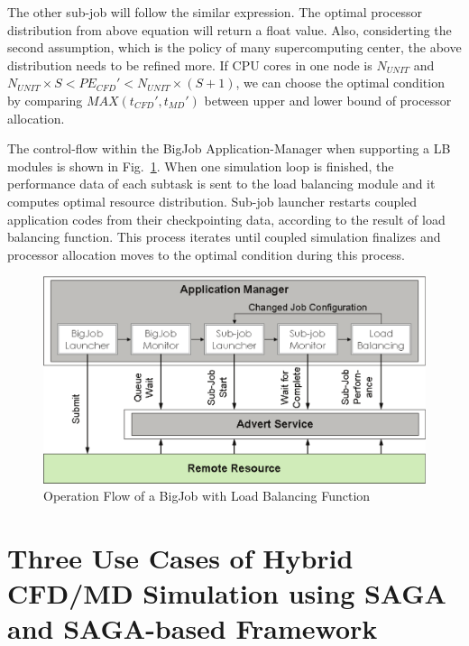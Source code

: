 \documentclass[conference,final]{IEEEtran}
\begin{document}
The other sub-job will follow the similar expression.
The optimal processor distribution from above equation will return a float value. Also, considerting the second assumption, which is the policy of many supercomputing center, the above distribution needs to be refined more. If CPU cores in one node is $N_{UNIT}$ and $N_{UNIT} \times S < PE_{CFD}' < N_{UNIT} \times (S+1)$, we can choose the optimal condition by comparing $MAX(t_{CFD}',t_{MD}')$ between upper and lower bound of processor allocation.


The control-flow within the BigJob Application-Manager when supporting a LB modules is shown
in Fig.~\ref{Fig:BigJob_LB}. When one simulation loop is finished, the performance data of each subtask is sent to the load balancing module and it computes optimal resource distribution. Sub-job launcher restarts coupled application codes from their checkpointing data, according to the result of load balancing function. This process iterates until coupled simulation finalizes and processor allocation moves to the optimal condition during this process.

\begin{figure}
\centering
\includegraphics[scale=0.40]{BigJob_with_Load_Balance}
\caption{\small Operation Flow of a BigJob with Load Balancing Function}
\label{Fig:BigJob_LB}
\end{figure}


\section{Three Use Cases of Hybrid CFD/MD Simulation using SAGA and SAGA-based Framework}
\end{document}
